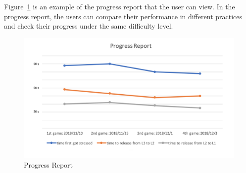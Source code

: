 Figure~\ref{fig:prog-rep} is an example of the progress report that the user can view. In the progress report, the users can compare their performance in different practices and check their progress under the same difficulty level.

\begin{figure}[H]
    \centering
    \includegraphics[width=0.75\linewidth]{progress-report.png}
    \caption{Progress Report}
    \label{fig:prog-rep}
\end{figure} 










